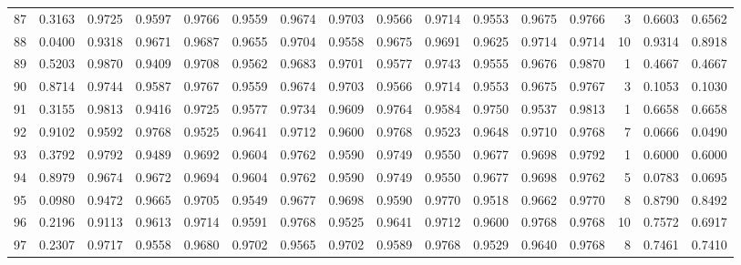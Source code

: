 \begin{tabular}{lrrrrrrrrrrrrrrr}
87  &      0.3163 &  0.9725 &  0.9597 &  0.9766 &  0.9559 &  0.9674 &  0.9703 &  0.9566 &  0.9714 &  0.9553 &   0.9675 &     0.9766 &      3 &                    0.6603 &                     0.6562 \\
88  &      0.0400 &  0.9318 &  0.9671 &  0.9687 &  0.9655 &  0.9704 &  0.9558 &  0.9675 &  0.9691 &  0.9625 &   0.9714 &     0.9714 &     10 &                    0.9314 &                     0.8918 \\
89  &      0.5203 &  0.9870 &  0.9409 &  0.9708 &  0.9562 &  0.9683 &  0.9701 &  0.9577 &  0.9743 &  0.9555 &   0.9676 &     0.9870 &      1 &                    0.4667 &                     0.4667 \\
90  &      0.8714 &  0.9744 &  0.9587 &  0.9767 &  0.9559 &  0.9674 &  0.9703 &  0.9566 &  0.9714 &  0.9553 &   0.9675 &     0.9767 &      3 &                    0.1053 &                     0.1030 \\
91  &      0.3155 &  0.9813 &  0.9416 &  0.9725 &  0.9577 &  0.9734 &  0.9609 &  0.9764 &  0.9584 &  0.9750 &   0.9537 &     0.9813 &      1 &                    0.6658 &                     0.6658 \\
92  &      0.9102 &  0.9592 &  0.9768 &  0.9525 &  0.9641 &  0.9712 &  0.9600 &  0.9768 &  0.9523 &  0.9648 &   0.9710 &     0.9768 &      7 &                    0.0666 &                     0.0490 \\
93  &      0.3792 &  0.9792 &  0.9489 &  0.9692 &  0.9604 &  0.9762 &  0.9590 &  0.9749 &  0.9550 &  0.9677 &   0.9698 &     0.9792 &      1 &                    0.6000 &                     0.6000 \\
94  &      0.8979 &  0.9674 &  0.9672 &  0.9694 &  0.9604 &  0.9762 &  0.9590 &  0.9749 &  0.9550 &  0.9677 &   0.9698 &     0.9762 &      5 &                    0.0783 &                     0.0695 \\
95  &      0.0980 &  0.9472 &  0.9665 &  0.9705 &  0.9549 &  0.9677 &  0.9698 &  0.9590 &  0.9770 &  0.9518 &   0.9662 &     0.9770 &      8 &                    0.8790 &                     0.8492 \\
96  &      0.2196 &  0.9113 &  0.9613 &  0.9714 &  0.9591 &  0.9768 &  0.9525 &  0.9641 &  0.9712 &  0.9600 &   0.9768 &     0.9768 &     10 &                    0.7572 &                     0.6917 \\
97  &      0.2307 &  0.9717 &  0.9558 &  0.9680 &  0.9702 &  0.9565 &  0.9702 &  0.9589 &  0.9768 &  0.9529 &   0.9640 &     0.9768 &      8 &                    0.7461 &                     0.7410 \\

\end{tabular}
